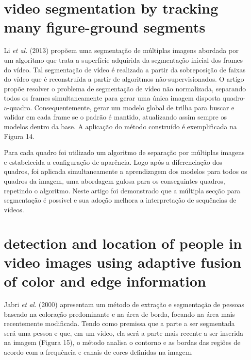 \documentclass[12pt,oneside,a4paper,chapter=TITLE,section=TITLE,sumario=tradicional]{abntex2}
\begin{document}
\section{video segmentation by tracking many figure-ground segments}
Li \textit{et al.} (2013) propõem uma segmentação de múltiplas imagens abordada por um algoritmo que trata a superfície adquirida da segmentação inicial dos frames do vídeo. Tal segmentação de vídeo é realizada a partir da sobreposição de faixas do vídeo que é reconstruída a partir de algoritmos não-supervisionados.
O artigo propõe resolver o problema de segmentação de vídeo não normalizada, separando todos os frames simultaneamente para gerar uma única imagem disposta quadro-a-quadro. Consequentemente, gerar um modelo global de trilha para buscar e validar em cada frame se o padrão é mantido, atualizando assim sempre os modelos dentro da base. A aplicação do método construído é exemplificada na Figura 14.

\begin{figure}[htb]
\end{figure}

Para cada quadro foi utilizado um algoritmo de separação por múltiplas imagens e estabelecida a configuração de aparência. Logo após a diferenciação dos quadros, foi aplicada simultaneamente a aprendizagem dos modelos para todos os quadros da imagem, uma abordagem gulosa para os conseguintes quadros, repetindo o algoritmo. Neste artigo foi demonstrado que a múltipla secção para segmentação é possível e sua adoção melhora a interpretação de sequências de vídeos.

\section{detection and location of people in video images using adaptive fusion of color and edge information}
Jabri \textit{et al.} (2000) apresentam um método de extração e segmentação de pessoas baseado na coloração predominante e na área de borda, focando na área mais recentemente modificada. Tendo como premissa que a parte a ser segmentada será uma pessoa e que, em um vídeo, ela será a parte mais recente a ser inserida na imagem (Figura 15), o método analisa o contorno e as bordas das regiões de acordo com a frequência e canais de cores definidas na imagem.
\end{document}
